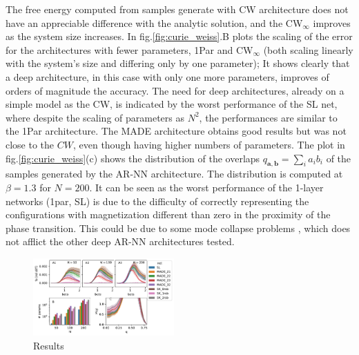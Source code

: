 \documentclass[aps,physrev,10pt,floatfix,reprint]{revtex4-2}
\begin{document}
The free energy computed from samples generate with CW architecture does not have an appreciable difference with the analytic solution, and the CW$_{\infty}$ improves as the system size increases. In fig.\ref{fig:curie_weiss}.B plots the scaling of the error for the architectures with fewer parameters, 1Par and CW$_{\infty}$ (both scaling linearly with the system's size and differing only by one parameter); It shows clearly that a deep architecture, in this case with only one more parameters, improves of orders of magnitude the accuracy. The need for deep architectures, already on a simple model as the CW, is indicated by the worst performance of the SL net, where despite the scaling of parameters as $N^2$, the performances are similar to the 1Par architecture. The MADE architecture obtains good results but was not close to the $CW$, even though having higher numbers of parameters. The plot in fig.\ref{fig:curie_weiss}(c) shows the distribution of the overlaps $q_{\mathbf{a}, \mathbf{b}}=\sum_{i} a_i b_i$ of the samples generated by the AR-NN architecture. The distribution is computed at $\beta=1.3$ for $N=200$. It can be seen as the worst performance of the 1-layer networks (1par, SL) is due to the difficulty of correctly representing the configurations with magnetization different than zero in the proximity of the phase transition. This could be due to some mode collapse problems \cite{https://doi.org/10.48550/arxiv.2210.11145}, which does not afflict the other deep AR-NN architectures tested.

\begin{figure}[]
    \centering 
    \includegraphics[width=0.48\textwidth]{img/SK_res.pdf}
    \caption{Results}
    \label{fig:SK}
\end{figure}
\end{document}
